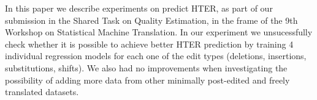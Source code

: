 In this paper we describe experiments on predict HTER, as part of our submission in the Shared Task on Quality  Estimation, in the frame of the 9th Workshop on Statistical Machine Translation. In our experiment we unsucessfully check whether it is possible to achieve better HTER prediction by training 4 individual regression models for each one of the edit types (deletions, insertions, substitutions, shifts). We also had no improvements when investigating the possibility of adding more data from other minimally post-edited and freely translated datasets.
